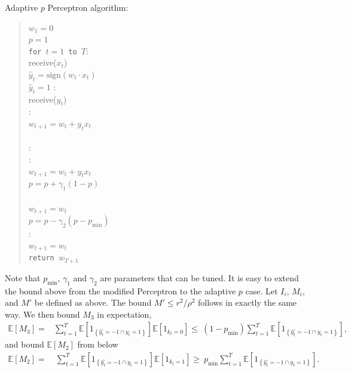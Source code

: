 \documentclass[12pt]{article}
\newcommand{\E}[0]{\mathbb{E}}
\begin{document}
\noindent Adaptive $p$ Perceptron algorithm:
\begin{quotation}
\noindent $w_1=0$\\
\noindent $p=1$\\
{\tt for $t=1$ to $T$}:\\
\indent receive($x_t$)\\
\indent $\widehat{y}_t=\mbox{sign}(w_t\cdot x_t)$\\
 $\widehat{y}_t =1$ : \\
\indent\indent receive($y_t$)\\
\indent{}:\\
\indent\indent\indent $w_{t+1} = w_t + y_t x_t$\\
\indent{}\\
:\\
\indent{}:\\
\indent\indent\indent $w_{t+1} = w_t + y_t x_t$\\
\indent\indent\indent $p=p + \gamma_1(1 - p)$\\
\indent{}\\
\indent\indent\indent $w_{t+1} = w_t$\\
\indent\indent\indent $p = p - \gamma_2(p - p_{\min})$\\
:\\
\indent\indent $w_{t+1} = w_t$\\
{\tt return $w_{T+1}$}
\end{quotation}
Note that $p_{\min}$, $\gamma_1$ and $\gamma_2$ are parameters that can be tuned. It is easy to extend the bound above from the modified Perceptron to the adaptive $p$ case.  Let $I_i$, $M_i$, and $M'$ be defined as above. The bound $M'\leq r^2/\rho^2$ follows in exactly the same way.  We then bound $M_3$ in expectation, 
\begin{align*}
\E[M_3] = & \sum_{t=1}^T \E[1_{\left\{\widehat{y_t} = -1 \cap y_t = 1\right\}}]\E[1_{k_t = 0}] \leq \  (1 - p_{\min})\sum_{t=1}^T \E[1_{\left\{\widehat{y_t} = -1 \cap y_t = 1\right\}}],
\end{align*}
and bound $\E[M_2]$ from below
\begin{align*}
\E[M_2] =&\ \sum_{t=1}^T \E[1_{\left\{\hat{y_t} = -1 \cap y_t = 1\right\}}]\E[1_{k_t = 1}] \geq \ p_{\min}\sum_{t=1}^T \E[1_{\left\{\hat{y_t} = -1 \cap y_t = 1\right\}}].
\end{align*}
\end{document}

